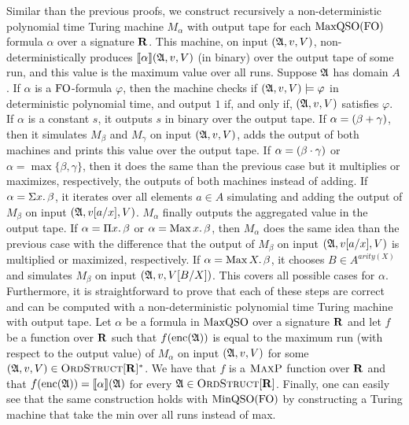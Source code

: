 Similar than the previous proofs, we construct recursively a non-deterministic polynomial time Turing machine $M_{\alpha}$ with output tape for each ${\rm MaxQSO}({\rm FO})$ formula $\alpha$ over a signature $\mathbf{R}$.
This machine, on input $(\mathfrak{A},v,V)$, non-deterministically produces ${\llbracket{}{\alpha}\rrbracket}(\mathfrak{A},v,V)$ (in binary) over the output tape of some run, and this value is the maximum value over all runs.
Suppose $\mathfrak{A}$ has domain $A$. If $\alpha$ is a ${\rm FO}$-formula $\varphi$, then the machine checks if $(\mathfrak{A},v,V)\models\varphi$ in deterministic polynomial time, and output $1$ if, and only if, $(\mathfrak{A},v,V)$ satisfies $\varphi$. If $\alpha$ is a constant $s$, it outputs $s$ in binary over the output tape. If $\alpha = (\beta + \gamma)$, then it simulates $M_{\beta}$ and $M_{\gamma}$ on input $(\mathfrak{A},v,V)$, adds the output of both machines and prints this value over the output tape. If $\alpha = (\beta \cdot \gamma)$ or $\alpha = \max\{\beta,\gamma\}$, then it does the same than the previous case but it multiplies or maximizes, respectively, the outputs of both machines instead of adding. 
If $\alpha = \Sigma{x}.\,\beta$, it iterates over all elements $a\in A$ simulating and adding the output of $M_{\beta}$ on input $(\mathfrak{A},v[a/x],V)$. $M_{\alpha}$ finally outputs the aggregated value in the output tape. 
If $\alpha = \Pi{x}.\,\beta$ or $\alpha = \operatorname{Max}{x}.\,\beta$, then $M_{\alpha}$ does the same idea than the previous case with the difference that the output of $M_{\beta}$ on input $(\mathfrak{A},v[a/x],V)$ is multiplied or maximized, respectively.
If $\alpha = \operatorname{Max}{X}.\,\beta$, it chooses $B\in A^{arity(X)}$ and simulates $M_{\beta}$ on input $(\mathfrak{A},v,V[B/X])$.
This covers all possible cases for $\alpha$.
Furthermore, it is straightforward to prove that each of these steps are correct and can be computed with a non-deterministic polynomial time Turing machine with output tape.
Let $\alpha$ be a formula in ${\rm MaxQSO}$ over a signature $\mathbf{R}$ and let $f$ be a function over $\mathbf{R}$ such that $f({\rm enc}(\mathfrak{A}))$ is equal to the maximum run (with respect to the output value) of $M_{\alpha}$ on input $(\mathfrak{A},v,V)$ for some $(\mathfrak{A},v,V) \in \text{\sc OrdStruct}[\mathbf{R}]^*$. We have that $f$ is a $\text{\sc MaxP}$ function over $\mathbf{R}$ and that $f({\rm enc}(\mathfrak{A})) = {\llbracket{}{\alpha}\rrbracket}(\mathfrak{A})$ for every $\mathfrak{A}\in\text{\sc OrdStruct}[\mathbf{R}]$.
Finally, one can easily see that the same construction holds with ${\rm MinQSO}({\rm FO})$ by constructing a Turing machine that take the min over all runs instead of max.

